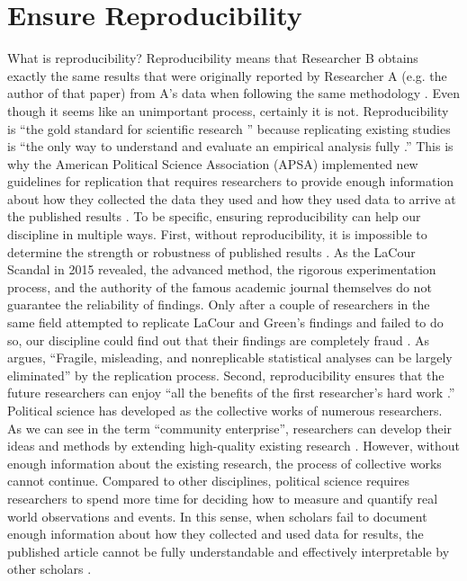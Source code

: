 
\section{Ensure Reproducibility}

What is reproducibility? Reproducibility means that Researcher B obtains exactly the same results that were originally reported by Researcher A (e.g. the author of that paper) from A’s data when following the same methodology \citep{Brunswik1955; Asendorpf et al.2013}. Even though it seems like an unimportant process, certainly it is not. Reproducibility is “the gold standard for scientific research \citep{Janz2015, 1}” because replicating existing studies is “the only way to understand and evaluate an empirical analysis fully \citep{King1995, 444}.” This is why the American Political Science Association (APSA) implemented new guidelines for replication that requires researchers to provide enough information about how they collected the data they used and how they used data to arrive at the published results \citep{Lupia and Elman2014}.
To be specific, ensuring reproducibility can help our discipline in multiple ways. First, without reproducibility, it is impossible to determine the strength or robustness of published results \citep{Lupia and Elman2014}. As the LaCour Scandal in 2015 revealed, the advanced method, the rigorous experimentation process, and the authority of the famous academic journal themselves do not guarantee the reliability of findings. Only after a couple of researchers in the same field attempted to replicate LaCour and Green’s findings and failed to do so, our discipline could find out that their findings are completely fraud \citep{Young and Janz2015}. As \citet{Dafoe2014, 62} argues, “Fragile, misleading, and nonreplicable statistical analyses can be largely eliminated” by the replication process. 
Second, reproducibility ensures that the future researchers can enjoy “all the benefits of the first researcher’s hard work \citep{King1995, 445}.” Political science has developed as the collective works of numerous researchers. As we can see in the term “community enterprise”, researchers can develop their ideas and methods by extending high-quality existing research \citep{King1995}. However, without enough information about the existing research, the process of collective works cannot continue. Compared to other disciplines, political science requires researchers to spend more time for deciding how to measure and quantify real world observations and events. In this sense, when scholars fail to document enough information about how they collected and used data for results, the published article cannot be fully understandable and effectively interpretable by other scholars \citep{Lupia and Elman2010}.
